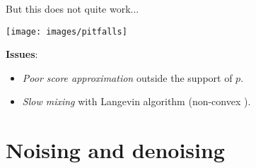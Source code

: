 \begin{frame}{But this does not quite work...}
    \begin{center}
        \texttt{[image: images/pitfalls]}
    \end{center}
    \textbf{Issues}:
    \begin{itemize}
        \item \textit{Poor score approximation} outside the support of $p$.
        \item \textit{Slow mixing} with Langevin algorithm (non-convex \cite{eberle2016reflection}).
    \end{itemize}
\end{frame}


\section{Noising and denoising}

